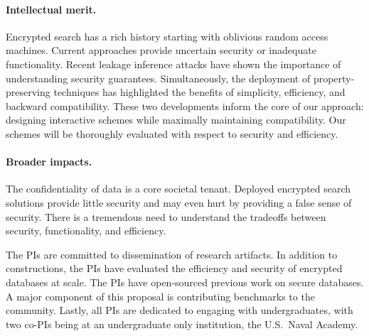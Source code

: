 \documentclass[11pt]{article}
\begin{document}
\paragraph{Intellectual merit.}  
Encrypted search has a rich history starting with oblivious random access machines.  Current approaches provide uncertain security or inadequate functionality.  Recent
leakage inference attacks have shown the importance of understanding security guarantees.  Simultaneously, the deployment of property-preserving
techniques has highlighted the benefits of simplicity, efficiency, and backward
compatibility.  These two developments inform the core of our approach: designing interactive schemes while maximally maintaining compatibility.  Our schemes will be thoroughly evaluated with respect to security and efficiency.

\paragraph{Broader impacts.}
The confidentiality of data is a core societal tenant.  Deployed encrypted search solutions provide little security and may even hurt by providing a false sense
of security.  There is a tremendous need to
understand the tradeoffs between security, functionality, and efficiency.

The PIs are committed to dissemination of research artifacts.  In addition to constructions, the PIs
have evaluated the efficiency and security of encrypted databases at scale.  The PIs have open-sourced
previous work on secure databases.  A major component of this proposal is contributing benchmarks to the community. Lastly, all PIs are
dedicated to engaging with undergraduates, with two co-PIs being at an
undergraduate only institution, the U.S.\ Naval Academy.  
\end{document}
